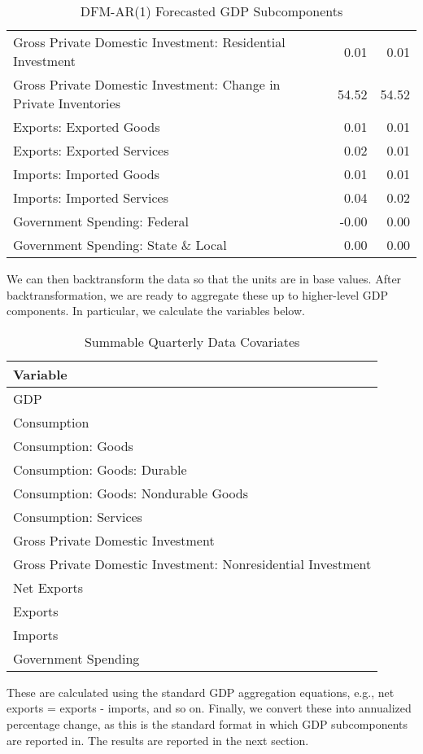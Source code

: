 \documentclass[11pt, letterpaper]{article}\usepackage[]{graphicx}\usepackage[]{color}
\begin{document}
\begin{table}[H]
\begin{tabular}{lrrr}
  Gross Private Domestic Investment: Residential Investment &  & 0.01 & 0.01 \\ 
  Gross Private Domestic Investment: Change in Private Inventories &  & 54.52 & 54.52 \\ 
  Exports: Exported Goods &  & 0.01 & 0.01 \\ 
  Exports: Exported Services &  & 0.02 & 0.01 \\ 
  Imports: Imported Goods &  & 0.01 & 0.01 \\ 
  Imports: Imported Services &  & 0.04 & 0.02 \\ 
  Government Spending: Federal &  & -0.00 & 0.00 \\ 
  Government Spending: State \& Local &  & 0.00 & 0.00 \\ 
   \hline
\end{tabular}
\endgroup
\caption{DFM-AR(1) Forecasted GDP Subcomponents} 
\end{table}


We can then backtransform the data so that the units are in base values. After backtransformation, we are ready to aggregate these up to higher-level GDP components. In particular, we calculate the variables below.
\begin{table}[H]
\centering
\begingroup\scriptsize
\begin{tabular}{l}
  \hline
Variable \\ 
  \hline
GDP \\ 
  Consumption \\ 
  Consumption: Goods \\ 
  Consumption: Goods: Durable \\ 
  Consumption: Goods: Nondurable Goods \\ 
  Consumption: Services \\ 
  Gross Private Domestic Investment \\ 
  Gross Private Domestic Investment: Nonresidential Investment \\ 
  Net Exports \\ 
  Exports \\ 
  Imports \\ 
  Government Spending \\ 
   \hline
\end{tabular}
\endgroup
\caption{Summable Quarterly Data Covariates} 
\end{table}

These are calculated using the standard GDP aggregation equations, e.g., net exports = exports - imports, and so on.
Finally, we convert these into annualized percentage change, as this is the standard format in which GDP subcomponents are reported in. The results are reported in the next section.
\end{document}
